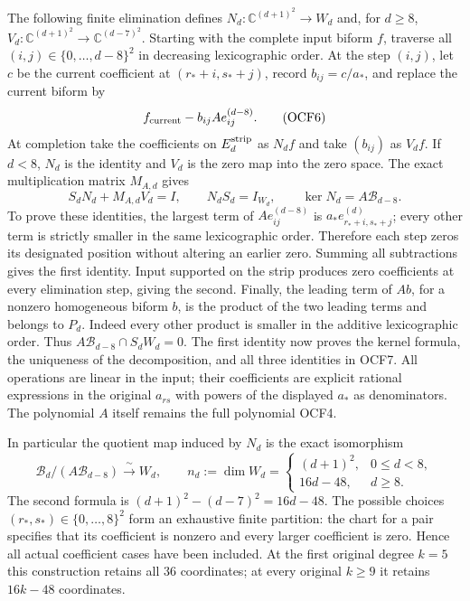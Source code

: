 \documentclass[11pt]{article}
\begin{document}
The following finite elimination defines
$N_d:\mathbb C^{(d+1)^2}\to W_d$ and, for $d\geq8$,
$V_d:\mathbb C^{(d+1)^2}\to\mathbb C^{(d-7)^2}$.
Starting with the complete input biform $f$, traverse all
$(i,j)\in\{0,\ldots,d-8\}^2$ in decreasing lexicographic order.
At the step $(i,j)$, let $c$ be the current coefficient at
$(r_*+i,s_*+j)$, record $b_{ij}=c/a_*$, and replace the current
biform by
\[
       f_{\rm current}-b_{ij}A e_{ij}^{(d-8)}.
 \tag{OCF6}
\]
At completion take the coefficients on $E_d^{\rm strip}$ as
$N_df$ and take $(b_{ij})$ as $V_df$. If $d<8$, $N_d$ is the
identity and $V_d$ is the zero map into the zero space.
The exact multiplication matrix $M_{A,d}$ gives
\[
 S_dN_d+M_{A,d}V_d=I,\qquad
 N_dS_d=I_{W_d},\qquad
 \ker N_d=A\mathcal B_{d-8}.
 \tag{OCF7}
\]
To prove these identities, the largest term of
$A e_{ij}^{(d-8)}$ is $a_*e_{r_*+i,s_*+j}^{(d)}$;
every other term is strictly smaller in the same lexicographic
order. Therefore each step zeros its designated position without
altering an earlier zero. Summing all subtractions gives the
first identity. Input supported on the strip produces zero
coefficients at every elimination step, giving the second.
Finally, the leading term of $Ab$, for a nonzero homogeneous
biform $b$, is the product of the two leading terms and belongs
to $P_d$. Indeed every other product is smaller in the additive
lexicographic order. Thus
$A\mathcal B_{d-8}\cap S_dW_d=0$. The first identity now proves
the kernel formula, the uniqueness of the decomposition, and all
three identities in OCF7. All operations are linear in the input;
their coefficients are explicit rational expressions in the
original $a_{rs}$ with powers of the displayed $a_*$ as denominators.
The polynomial $A$ itself remains the full polynomial OCF4.

In particular the quotient map induced by $N_d$ is the exact
isomorphism
\[
 \mathcal B_d/(A\mathcal B_{d-8})\xrightarrow{\ \sim\ }W_d,
 \qquad
 n_d:=\dim W_d=
 \begin{cases}(d+1)^2,&0\leq d<8,\\16d-48,&d\geq8.
 \end{cases}
 \tag{OCF8}
\]
The second formula is
$(d+1)^2-(d-7)^2=16d-48$. The possible choices
$(r_*,s_*)\in\{0,\ldots,8\}^2$ form an exhaustive finite
partition: the chart for a pair specifies that its coefficient
is nonzero and every larger coefficient is zero. Hence all actual
coefficient cases have been included. At the first original
degree $k=5$ this construction retains all $36$ coordinates;
at every original $k\geq9$ it retains $16k-48$ coordinates.
\end{document}
